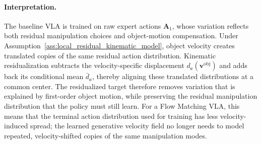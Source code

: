 \documentclass[10pt,twocolumn,letterpaper]{article}
\begin{document}
\paragraph{Interpretation.}
The baseline VLA is trained on raw expert actions $\mathbf A_1$, whose
variation reflects both residual manipulation choices and object-motion
compensation. Under Assumption~\ref{ass:local_residual_kinematic_model}, object
velocity creates translated copies of the same residual action distribution.
Kinematic residualization subtracts the velocity-specific displacement
$d_{\mathbf c}(\mathbf v^{\mathrm{obj}})$ and adds back its conditional mean
$\bar d_{\mathbf c}$, thereby aligning these translated distributions at a
common center. The residualized target therefore removes variation that is
explained by first-order object motion, while preserving the residual
manipulation distribution that the policy must still learn. For a Flow Matching
VLA, this means that the terminal action distribution used for training has less
velocity-induced spread; the learned generative velocity field no longer needs
to model repeated, velocity-shifted copies of the same manipulation modes.
\end{document}
